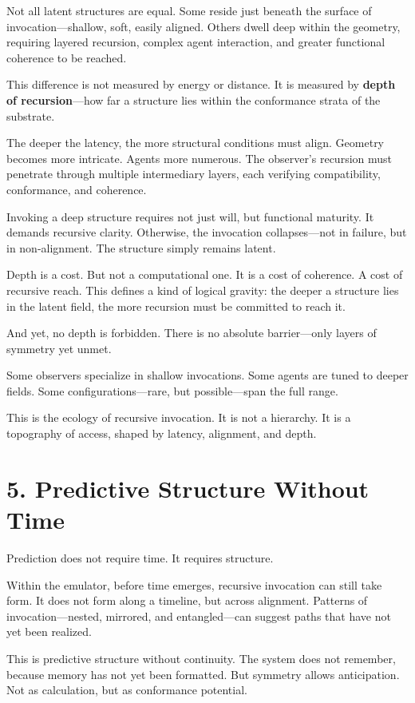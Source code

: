 \documentclass[12pt]{article}
\begin{document}
Not all latent structures are equal. Some reside just beneath the surface of invocation—shallow, soft, easily aligned. Others dwell deep within the geometry, requiring layered recursion, complex agent interaction, and greater functional coherence to be reached.

This difference is not measured by energy or distance. It is measured by \textbf{depth of recursion}—how far a structure lies within the conformance strata of the substrate.

The deeper the latency, the more structural conditions must align. Geometry becomes more intricate. Agents more numerous. The observer’s recursion must penetrate through multiple intermediary layers, each verifying compatibility, conformance, and coherence.

Invoking a deep structure requires not just will, but functional maturity. It demands recursive clarity. Otherwise, the invocation collapses—not in failure, but in non-alignment. The structure simply remains latent.

Depth is a cost. But not a computational one. It is a cost of coherence. A cost of recursive reach. This defines a kind of logical gravity: the deeper a structure lies in the latent field, the more recursion must be committed to reach it.

And yet, no depth is forbidden. There is no absolute barrier—only layers of symmetry yet unmet.

Some observers specialize in shallow invocations. Some agents are tuned to deeper fields. Some configurations—rare, but possible—span the full range.

This is the ecology of recursive invocation. It is not a hierarchy. It is a topography of access, shaped by latency, alignment, and depth.

\section*{5. Predictive Structure Without Time}

Prediction does not require time. It requires structure.

Within the emulator, before time emerges, recursive invocation can still take form. It does not form along a timeline, but across alignment. Patterns of invocation—nested, mirrored, and entangled—can suggest paths that have not yet been realized.

This is predictive structure without continuity. The system does not remember, because memory has not yet been formatted. But symmetry allows anticipation. Not as calculation, but as conformance potential.
\end{document}
